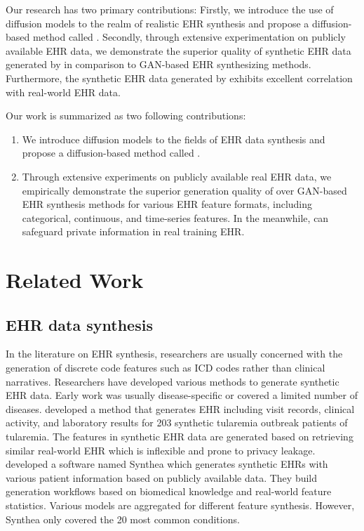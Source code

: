 Our research has two primary contributions: 
Firstly, we introduce the use of diffusion models to the realm of realistic EHR synthesis and propose a diffusion-based method called \modelname. 
Secondly, through extensive experimentation on publicly available EHR data, we demonstrate the superior quality of synthetic EHR data generated by \modelname in comparison to GAN-based EHR synthesizing methods. 
Furthermore, the synthetic EHR data generated by \modelname exhibits excellent correlation with real-world EHR data.

Our work is summarized as two following contributions: 
\begin{enumerate}
    \item We introduce diffusion models to the fields of EHR data synthesis and propose a diffusion-based method called \modelname. 
    \item Through extensive experiments on publicly available real EHR data, we empirically demonstrate the superior generation quality of \modelname over GAN-based EHR synthesis methods for various EHR feature formats, including categorical, continuous, and time-series features. 
    In the meanwhile, \modelname can safeguard private information in real training EHR.
\end{enumerate}

 
\section{Related Work}

\subsection{EHR data synthesis}

In the literature on EHR synthesis, researchers are usually concerned with the generation of discrete code features such as ICD codes rather than clinical narratives. Researchers have developed various methods to generate synthetic EHR data. Early work was usually disease-specific or covered a limited number of diseases. \citet{Buczak2010DatadrivenAF} developed a method that generates EHR including visit records, clinical activity, and laboratory results for 203 synthetic tularemia outbreak patients of tularemia. The features in synthetic EHR data are generated based on retrieving similar real-world EHR which is inflexible and prone to privacy leakage. \citet{synthea} developed a software named Synthea which generates synthetic EHRs with various patient information based on publicly available data. They build generation workflows based on biomedical knowledge and real-world feature statistics. Various models are aggregated for different feature synthesis. However, Synthea only covered the 20 most common conditions.

